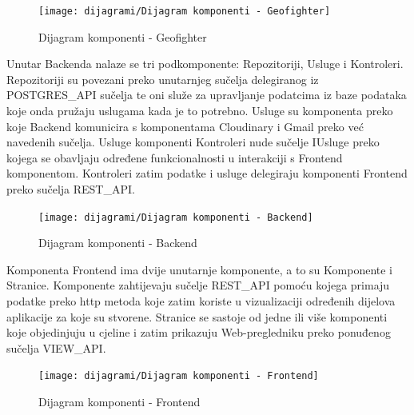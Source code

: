 		\begin{figure}[H]
			\texttt{[image: dijagrami/Dijagram  komponenti - Geofighter]}				
			\centering
			\caption{Dijagram komponenti - Geofighter}
			\label{}
		\end{figure}
	
		{Unutar Backenda nalaze se tri podkomponente: Repozitoriji, Usluge i Kontroleri. Repozitoriji su povezani preko unutarnjeg sučelja delegiranog iz POSTGRES\_API sučelja te oni služe za upravljanje podatcima iz baze podataka koje onda pružaju uslugama kada je to potrebno. Usluge su komponenta preko koje Backend komunicira s komponentama Cloudinary i Gmail preko već navedenih sučelja. Usluge komponenti Kontroleri nude sučelje IUsluge preko kojega se obavljaju određene funkcionalnosti u interakciji s Frontend komponentom. Kontroleri zatim podatke i usluge delegiraju komponenti Frontend preko sučelja REST\_API. }
		
			\begin{figure}[H]
			\texttt{[image: dijagrami/Dijagram  komponenti - Backend]}				
			\centering
			\caption{Dijagram komponenti - Backend}
			\label{}
		\end{figure}
	
		{Komponenta Frontend ima dvije unutarnje komponente, a to su Komponente i Stranice. Komponente zahtijevaju sučelje REST\_API pomoću kojega primaju podatke preko http metoda koje zatim koriste u vizualizaciji određenih dijelova aplikacije za koje su stvorene. Stranice se sastoje od jedne ili više komponenti koje objedinjuju u cjeline i zatim prikazuju Web-pregledniku preko ponuđenog sučelja VIEW\_API.   }
		
		\begin{figure}[H]
			\texttt{[image: dijagrami/Dijagram  komponenti - Frontend]}				
			\centering
			\caption{Dijagram komponenti - Frontend}
			\label{}
		\end{figure}
			
		\eject
			